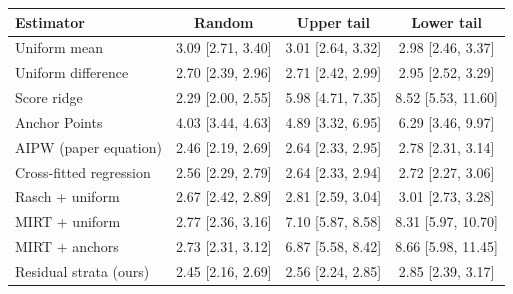 \begin{tabular}{lccc}
\toprule
Estimator & Random & Upper tail & Lower tail \\
\midrule
Uniform mean & 3.09 [2.71, 3.40] & 3.01 [2.64, 3.32] & 2.98 [2.46, 3.37] \\
Uniform difference & 2.70 [2.39, 2.96] & 2.71 [2.42, 2.99] & 2.95 [2.52, 3.29] \\
Score ridge & 2.29 [2.00, 2.55] & 5.98 [4.71, 7.35] & 8.52 [5.53, 11.60] \\
Anchor Points & 4.03 [3.44, 4.63] & 4.89 [3.32, 6.95] & 6.29 [3.46, 9.97] \\
AIPW (paper equation) & 2.46 [2.19, 2.69] & 2.64 [2.33, 2.95] & 2.78 [2.31, 3.14] \\
Cross-fitted regression & 2.56 [2.29, 2.79] & 2.64 [2.33, 2.94] & 2.72 [2.27, 3.06] \\
Rasch + uniform & 2.67 [2.42, 2.89] & 2.81 [2.59, 3.04] & 3.01 [2.73, 3.28] \\
MIRT + uniform & 2.77 [2.36, 3.16] & 7.10 [5.87, 8.58] & 8.31 [5.97, 10.70] \\
MIRT + anchors & 2.73 [2.31, 3.12] & 6.87 [5.58, 8.42] & 8.66 [5.98, 11.45] \\
Residual strata (ours) & 2.45 [2.16, 2.69] & 2.56 [2.24, 2.85] & 2.85 [2.39, 3.17] \\
\bottomrule
\end{tabular}
